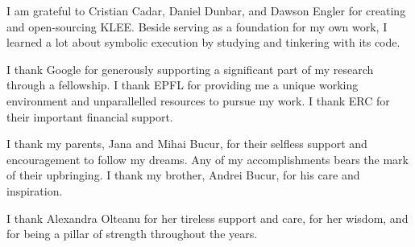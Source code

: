 I am grateful to Cristian Cadar, Daniel Dunbar, and Dawson Engler for creating and open-sourcing KLEE.  Beside serving as a foundation for my own work, I learned a lot about symbolic execution by studying and tinkering with its code.


I thank Google for generously supporting a significant part of my research through a fellowship.
%
I thank EPFL for providing me a unique working environment and unparallelled resources to pursue my work.
%
I thank ERC for their important financial support.


I thank my parents, Jana and Mihai Bucur, for their selfless support and encouragement to follow my dreams.  Any of my accomplishments bears the mark of their upbringing.
%
I thank my brother, Andrei Bucur, for his care and inspiration.


I thank Alexandra Olteanu for her tireless support and care, for her wisdom, and for being a pillar of strength throughout the years.

